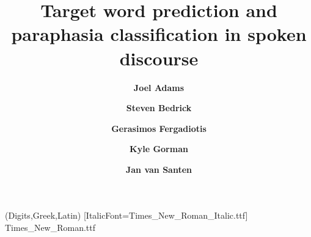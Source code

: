 \usepackage{authblk}
\usepackage{amsmath}
\usepackage{graphicx}
\usepackage{mathspec}
\setmainfont[BoldFont=Times_New_Roman_Bold.ttf,
             ItalicFont=Times_New_Roman_Italic.ttf, Mapping=tex-text]%
            {Times_New_Roman.ttf}
\setmathfont(Digits,Greek,Latin)%
            [ItalicFont=Times_New_Roman_Italic.ttf]%
            {Times_New_Roman.ttf}
\usepackage{microtype}
\usepackage{naaclhlt2016}
\usepackage{url}

\def\naaclpaperid{***} %


\title{Target word prediction and paraphasia classification in spoken discourse}


\author[1]{\textbf{Joel Adams}}
\author[1]{\textbf{Steven Bedrick}}
\author[2]{\textbf{Gerasimos Fergadiotis}}
\author[3]{\textbf{Kyle Gorman}}
\author[1]{\textbf{Jan van Santen}}
\renewcommand\Authands{ and }

